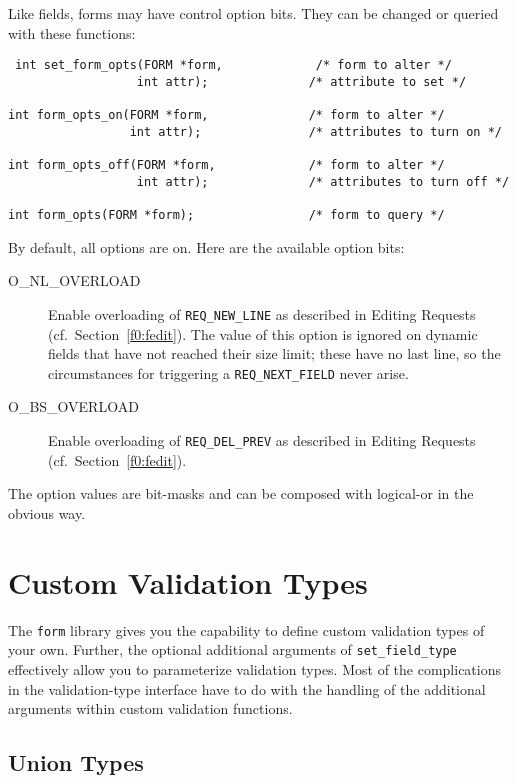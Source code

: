 \label{f0:frmoptions}Like fields, forms may have control option bits.  They can be changed
or queried with these functions:
\begin{verbatim} int set_form_opts(FORM *form,             /* form to alter */
                  int attr);              /* attribute to set */

int form_opts_on(FORM *form,              /* form to alter */
                 int attr);               /* attributes to turn on */

int form_opts_off(FORM *form,             /* form to alter */
                  int attr);              /* attributes to turn off */

int form_opts(FORM *form);                /* form to query */
\end{verbatim}
By default, all options are on.  Here are the available option bits:
\begin{description}
\item[ O\_NL\_OVERLOAD]  Enable overloading of \texttt{REQ\_NEW\_LINE} as described in Editing Requests (cf.\ Section~\ref{f0:fedit}).  The value of this option is
ignored on dynamic fields that have not reached their size limit;
these have no last line, so the circumstances for triggering a
\texttt{REQ\_NEXT\_FIELD} never arise.
\item[ O\_BS\_OVERLOAD]  Enable overloading of \texttt{REQ\_DEL\_PREV} as described in
Editing Requests (cf.\ Section~\ref{f0:fedit}).
\end{description}
The option values are bit-masks and can be composed with logical-or in
the obvious way.

\section{Custom Validation Types}

\label{f0:fcustom}The \texttt{form} library gives you the capability to define custom
validation types of your own.  Further, the optional additional arguments
of \texttt{set\_field\_type} effectively allow you to parameterize validation
types.  Most of the complications in the validation-type interface have to
do with the handling of the additional arguments within custom validation
functions.

\subsection{Union Types}

